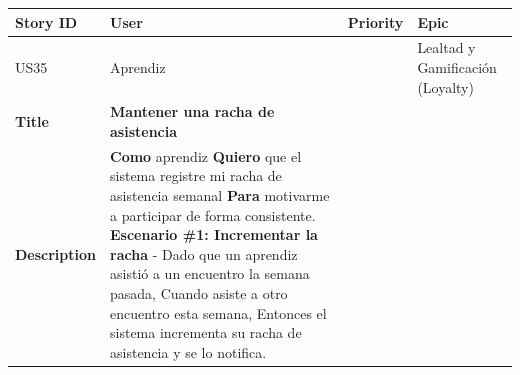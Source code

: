 {\def\LTcaptype{none} %
\begin{longtable}[]{@{}
  >{\raggedright\arraybackslash}p{}
  >{\raggedright\arraybackslash}p{}
  >{\raggedright\arraybackslash}p{}
  >{\raggedright\arraybackslash}p{}@{}}
\toprule\noalign{}
\begin{minipage}[b]{\linewidth}\raggedright
Story ID
\end{minipage} & \begin{minipage}[b]{\linewidth}\raggedright
User
\end{minipage} & \begin{minipage}[b]{\linewidth}\raggedright
Priority
\end{minipage} & \begin{minipage}[b]{\linewidth}\raggedright
Epic
\end{minipage} \\
\midrule\noalign{}
\endhead
\bottomrule\noalign{}
\endlastfoot
US35 & Aprendiz & 3 & Lealtad y Gamificación (Loyalty) \\
\textbf{Title} & \textbf{Mantener una racha de asistencia} & & \\
\textbf{Description} & \textbf{Como} aprendiz \textbf{Quiero} que el
sistema registre mi racha de asistencia semanal \textbf{Para} motivarme
a participar de forma consistente. \textbf{Escenario \#1: Incrementar la
racha} - Dado que un aprendiz asistió a un encuentro la semana pasada,
Cuando asiste a otro encuentro esta semana, Entonces el sistema
incrementa su racha de asistencia y se lo notifica. & & \\
\end{longtable}
}

